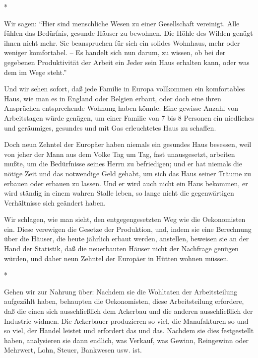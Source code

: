 \documentclass{scrbook}
\begin{document}
\begin{center}*\end{center}

Wir sagen: ``Hier sind menschliche Wesen zu einer Gesellschaft vereinigt. Alle fühlen das Bedürfnis, gesunde Häuser zu bewohnen. Die Höhle des Wilden genügt ihnen nicht mehr. Sie beanspruchen für sich ein solides Wohnhaus, mehr oder weniger komfortabel. – Es handelt sich nun darum, zu wissen, ob bei der gegebenen Produktivität der Arbeit ein Jeder sein Haus erhalten kann, oder was dem im Wege steht.''

Und wir sehen sofort, daß jede Familie in Europa vollkommen ein komfortables Haus, wie man es in England oder Belgien erbaut, oder doch eine ihren Ansprüchen entsprechende Wohnung haben könnte. Eine gewisse Anzahl von Arbeitstagen würde genügen, um einer Familie von 7 bis 8 Personen ein niedliches und geräumiges, gesundes und mit Gas erleuchtetes Haus zu schaffen.

Doch neun Zehntel der Europäer haben niemals ein gesundes Haus besessen, weil von jeher der Mann aus dem Volke Tag um Tag, fast unausgesetzt, arbeiten mußte, um die Bedürfnisse seines Herrn zu befriedigen; und er hat niemals die nötige Zeit und das notwendige Geld gehabt, um sich das Haus seiner Träume zu erbauen oder erbauen zu lassen. Und er wird auch nicht ein Haus bekommen, er wird ständig in einem wahren Stalle leben, so lange nicht die gegenwärtigen Verhältnisse sich geändert haben.

Wir schlagen, wie man sieht, den entgegengesetzten Weg wie die Oekonomisten ein. Diese verewigen die Gesetze der Produktion, und, indem sie eine Berechnung über die Häuser, die heute jährlich erbaut werden, anstellen, beweisen sie an der Hand der Statistik, daß die neuerbauten Häuser nicht der Nachfrage genügen würden, und daher neun Zehntel der Europäer in Hütten wohnen müssen.

\begin{center}*\end{center}

Gehen wir zur Nahrung über: Nachdem sie die Wohltaten der Arbeitsteilung aufgezählt haben, behaupten die Oekonomisten, diese Arbeitsteilung erfordere, daß die einen sich ausschließlich dem Ackerbau und die anderen ausschließlich der Industrie widmen. Die Ackerbauer produzieren so viel, die Manufakturen so und so viel, der Handel leistet und erfordert das und das. Nachdem sie dies festgestellt haben, analysieren sie dann endlich, was Verkauf, was Gewinn, Reingewinn oder Mehrwert, Lohn, Steuer, Bankwesen usw. ist.
\end{document}
